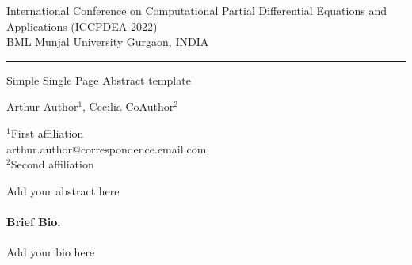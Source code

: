 \documentclass[a4paper]{article}
\begin{document}
 \thispagestyle{plain}
 \begin{minipage}[t][1cm][t]{14cm}
  \begin{flushright}
   \scriptsize
\vspace{-30pt}
   International Conference on Computational Partial Differential Equations and Applications (ICCPDEA-2022) \\
   BML Munjal University Gurgaon, INDIA \\
    \rule{14cm}{0.3mm}
  \end{flushright}
 \end{minipage}
 

\Large
 \begin{center}
Simple Single Page Abstract template\\

\hspace{10pt}

\large
Arthur Author$^1$, Cecilia CoAuthor$^2$ \\

\hspace{10pt}

\small
$^1$First affiliation\\
arthur.author@correspondence.email.com\\
$^2$Second affiliation

\end{center}

\hspace{10pt}

\normalsize

Add your abstract here

\paragraph{Brief Bio.}

Add your bio here
\end{document}
